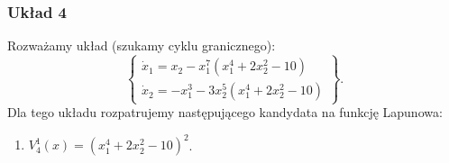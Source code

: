\documentclass{sprawozdanie-agh}
\begin{document}
        \subsubsection{Układ 4}
        Rozważamy układ (szukamy cyklu granicznego):
        \begin{equation}
            \label{eq:zadania_przyklad_4}
            \left\{
            \begin{array}{l}
                 \dot{x}_{1} = x_{2} - x_{1}^7 \left( x_{1}^{4} + 2x_{2}^{2} - 10 \right)\\
                 \dot{x}_{2} = -x_{1}^{3} - 3x_{2}^{5} \left( x_{1}^{4} + 2x_{2}^{2} - 10 \right)
            \end{array}
            \right\}.
        \end{equation}
        Dla tego układu rozpatrujemy następującego kandydata na funkcję Lapunowa:
        \begin{enumerate}[label=(\alph*)]
            \item $V_{4}^{1}(x) = \left( x_{1}^{4} + 2x_{2}^{2} - 10 \right)^{2}$.
        \end{enumerate}
\end{document}
